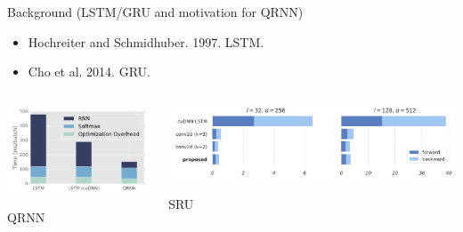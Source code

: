 \documentclass{beamer}
\begin{document}
\begin{frame}{Background (LSTM/GRU and motivation for QRNN)}{}
\begin{itemize}
\item Hochreiter and Schmidhuber. 1997. LSTM.
\item Cho et al. 2014. GRU.
\end{itemize}

\begin{columns}[T] %
\begin{column}{.48\textwidth}
\centering
\includegraphics[width=\textwidth]{img/qrnn_perf.png}

QRNN
\end{column}%
\hfill%
\begin{column}{.48\textwidth}
\begin{minipage}[c][.4\textheight][c]{\linewidth}
\centering
\includegraphics[width=\textwidth]{img/sru_perf.png}

SRU
\end{minipage}
\end{column}%
\end{columns}

\end{frame}
\end{document}
